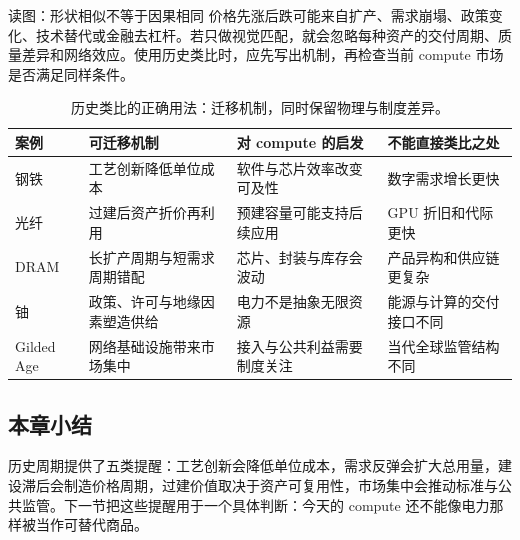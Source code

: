\begin{warningbox}{读图：形状相似不等于因果相同}
价格先涨后跌可能来自扩产、需求崩塌、政策变化、技术替代或金融去杠杆。若只做视觉匹配，就会忽略每种资产的交付周期、质量差异和网络效应。使用历史类比时，应先写出机制，再检查当前 compute 市场是否满足同样条件。
\end{warningbox}

\begin{table}[H]
\centering
\begin{tabular}{L{0.14\textwidth}L{0.21\textwidth}L{0.23\textwidth}L{0.25\textwidth}}
\toprule
案例 & 可迁移机制 & 对 compute 的启发 & 不能直接类比之处 \\
\midrule
钢铁 & 工艺创新降低单位成本 & 软件与芯片效率改变可及性 & 数字需求增长更快 \\
光纤 & 过建后资产折价再利用 & 预建容量可能支持后续应用 & GPU 折旧和代际更快 \\
DRAM & 长扩产周期与短需求周期错配 & 芯片、封装与库存会波动 & 产品异构和供应链更复杂 \\
铀 & 政策、许可与地缘因素塑造供给 & 电力不是抽象无限资源 & 能源与计算的交付接口不同 \\
Gilded Age & 网络基础设施带来市场集中 & 接入与公共利益需要制度关注 & 当代全球监管结构不同 \\
\bottomrule
\end{tabular}
\caption{历史类比的正确用法：迁移机制，同时保留物理与制度差异。}
\end{table}

\subsection{本章小结}

历史周期提供了五类提醒：工艺创新会降低单位成本，需求反弹会扩大总用量，建设滞后会制造价格周期，过建价值取决于资产可复用性，市场集中会推动标准与公共监管。下一节把这些提醒用于一个具体判断：今天的 compute 还不能像电力那样被当作可替代商品。

